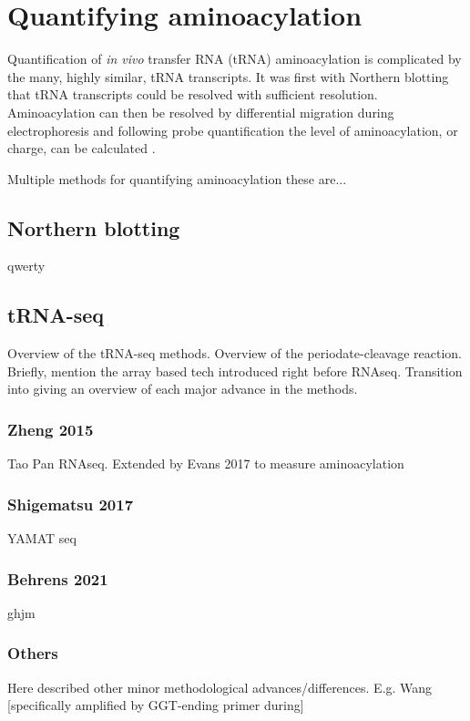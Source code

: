 \section{Quantifying aminoacylation}

Quantification of \textit{in vivo} transfer RNA (tRNA) aminoacylation is complicated by the many, highly similar, tRNA transcripts.
It was first with Northern blotting that tRNA transcripts could be resolved with sufficient resolution.
Aminoacylation can then be resolved by differential migration during electrophoresis and following probe quantification the level of aminoacylation, or charge, can be calculated \cite{Ho1987-ug, Varshney1991-zp, Stenum2017-wn}.





Multiple methods for quantifying aminoacylation these are...


\subsection{Northern blotting}
qwerty

\subsection{tRNA-seq}
Overview of the tRNA-seq methods.
Overview of the periodate-cleavage reaction.
Briefly, mention the array based tech introduced right before RNAseq.
Transition into giving an overview of each major advance in the methods.

\subsubsection{Zheng 2015}
Tao Pan RNAseq.
Extended by Evans 2017 to measure aminoacylation
\cite{Zheng2015-kj}


\subsubsection{Shigematsu 2017}
YAMAT seq


\subsubsection{Behrens 2021}
ghjm

\subsubsection{Others}
Here described other minor methodological advances/differences.
E.g. Wang [specifically amplified by GGT-ending primer during]







